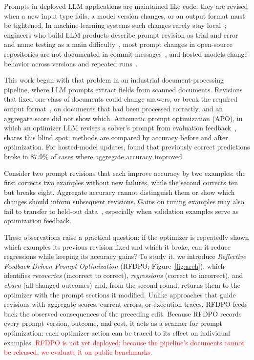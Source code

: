 \documentclass[11pt]{article}
\begin{document}
Prompts in deployed LLM applications are maintained like code: they are revised when a new input type fails, a model version changes, or an output format must be tightened. In machine-learning systems such changes rarely stay local~\citep{sculley2015debt}; engineers who build LLM products describe prompt revision as trial and error and name testing as a main difficulty~\citep{parnin2023copilot}, most prompt changes in open-source repositories are not documented in commit messages~\citep{tafreshipour2025prompting}, and hosted models change behavior across versions and repeated runs~\citep{chen2023drift,atil2025nondeterminism}.

This work began with that problem in an industrial document-processing pipeline, where LLM prompts extract fields from scanned documents. Revisions that fixed one class of documents could change answers, or break the required output format~\citep{liu2024structured}, on documents that had been processed correctly, and an aggregate score did not show which. Automatic prompt optimization (APO), in which an optimizer LLM revises a solver's prompt from evaluation feedback~\citep{zhou2023ape,yang2024opro,pryzant2023protegi}, shares this blind spot: methods are compared by accuracy before and after optimization. For hosted-model updates, \citet{ma2024regression} found that previously correct predictions broke in 87.9\% of cases where aggregate accuracy improved.

Consider two prompt revisions that each improve accuracy by two examples: the first corrects two examples without new failures, while the second corrects ten but breaks eight. Aggregate accuracy cannot distinguish them or show which changes should inform subsequent revisions. Gains on tuning examples may also fail to transfer to held-out data~\citep{recht2019imagenet}, especially when validation examples serve as optimization feedback.

These observations raise a practical question: if the optimizer is repeatedly shown which examples its previous revision fixed and which it broke, can it reduce regressions while keeping its accuracy gains? To study it, we introduce \emph{Reflective Feedback-Driven Prompt Optimization} (RFDPO; Figure~\ref{fig:arch}), which identifies \emph{recoveries} (incorrect to correct), \emph{regressions} (correct to incorrect), and \emph{churn} (all changed outcomes) and, from the second round, returns them to the optimizer with the prompt sections it modified. Unlike approaches that guide revisions with aggregate scores, current errors, or execution traces, RFDPO feeds back the observed consequences of the preceding edit. Because RFDPO records every prompt version, outcome, and cost, it acts as a scanner for prompt optimization: each optimizer action can be traced to its effect on individual examples. \textcolor{red}{RFDPO is not yet deployed; because the pipeline's documents cannot be released, we evaluate it on public benchmarks.}
\end{document}
